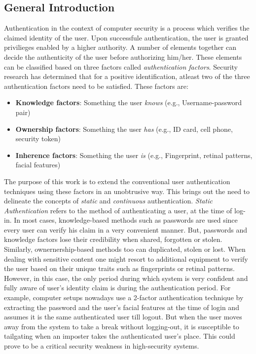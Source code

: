 \documentclass[12pt]{article}			%
\begin{document}

\subsection{ General Introduction }

Authentication in the context of computer security is a process which verifies the claimed identity of the user. Upon successfule authentication, the user is granted privilieges enabled by a higher authority. A number of elements together can decide the authenticity of the user before authorizing him/her. These elements can be classified based on three factors called \emph{authentication factors}.
Security research has determined that for a positive identification, atleast two of the three authentication factors need to be satisfied.
These factors are:

\begin{itemize}
	\item \textbf{Knowledge factors}: Something the user \emph{knows} (e.g., Username-password pair)
	\item \textbf{Ownership factors}: Something the user \emph{has} (e.g., ID card, cell phone, security token)
	\item \textbf{Inherence factors}: Something the user \emph{is} (e.g., Fingerprint, retinal patterns, facial features)
\end{itemize}

The purpose of this work is to extend the conventional user authentication techniques using these factors in an unobtrusive way.
This brings out the need to delineate the concepts of \emph{static} and \emph{continuous} authentication.
\emph{Static Authentication} refers to the method of authenticating a user, at the time of log-in. In most cases, knowledge-based methods such as passwords are used since every user can verify his claim in a very convenient manner. But, passwords and knowledge factors lose their credibility when shared, forgotten or stolen. Similarly, ownernership-based methods too can duplicated, stolen or lost.
When dealing with sensitive content one might resort to additional equipment to verify the user based on their unique traits such as fingerprints or retinal patterns. However, in this case, the only period during which system is very confident and fully aware of user's identity claim is during the authentication period.
For example, computer setups nowadays use a 2-factor authentication technique by extracting the password and the user's facial features at the time of login and assumes it is the same authenticated user till logout. But when the user moves away from the system to take a break without logging-out, it is susceptible to tailgating when an imposter takes the authenticated user's place. This could prove to be a critical security weakness in  high-security systems.
\end{document}

